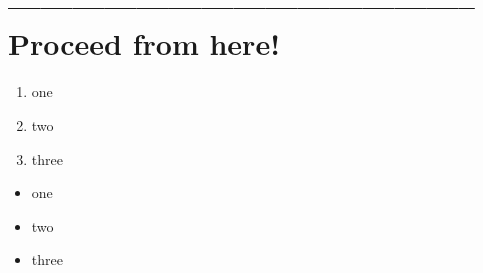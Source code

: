 \documentclass[11pt,a4paper, titlepage, parskip=half, headsepline, footsepline, cleardoublepage=current, headheight=1cm]{scrbook}
\begin{document}
\section{-------------------------------------------- Proceed from here!}
\lipsum[1]

\begin{enumerate}[label=P\arabic*.]
\item{one}
\item{two}
\item{three}
\end{enumerate}

\begin{itemize}[nosep]
\item{one}
\item{two}
\item{three}
\end{itemize}

\begin{lstlisting}[numbers=left]
\end{lstlisting}


\end{document}
